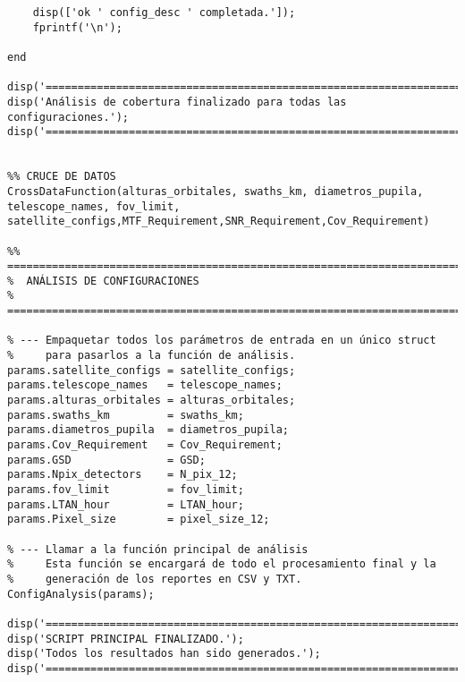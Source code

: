 \begin{verbatim}
    disp(['ok ' config_desc ' completada.']);
    fprintf('\n');

end

disp('====================================================================');
disp('Análisis de cobertura finalizado para todas las configuraciones.');
disp('====================================================================');


%% CRUCE DE DATOS
CrossDataFunction(alturas_orbitales, swaths_km, diametros_pupila, telescope_names, fov_limit, satellite_configs,MTF_Requirement,SNR_Requirement,Cov_Requirement)

%% ========================================================================
%  ANÁLISIS DE CONFIGURACIONES
%  ========================================================================

% --- Empaquetar todos los parámetros de entrada en un único struct
%     para pasarlos a la función de análisis.
params.satellite_configs = satellite_configs;
params.telescope_names   = telescope_names;
params.alturas_orbitales = alturas_orbitales;
params.swaths_km         = swaths_km;
params.diametros_pupila  = diametros_pupila;
params.Cov_Requirement   = Cov_Requirement;
params.GSD               = GSD;
params.Npix_detectors    = N_pix_12; 
params.fov_limit         = fov_limit;
params.LTAN_hour         = LTAN_hour;
params.Pixel_size        = pixel_size_12;

% --- Llamar a la función principal de análisis
%     Esta función se encargará de todo el procesamiento final y la
%     generación de los reportes en CSV y TXT.
ConfigAnalysis(params);

disp('====================================================================');
disp('SCRIPT PRINCIPAL FINALIZADO.');
disp('Todos los resultados han sido generados.');
disp('====================================================================');


\end{verbatim}